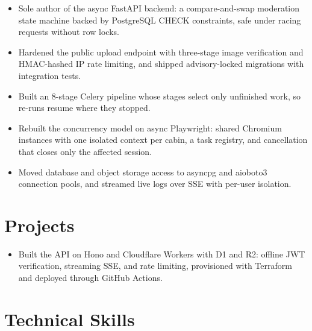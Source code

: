 \documentclass[10pt,a4paper]{article}
\begin{document}
\begin{itemize}
  \item Sole author of the async FastAPI backend: a compare-and-swap moderation state machine backed by PostgreSQL CHECK constraints, safe under racing requests without row locks.
  \item Hardened the public upload endpoint with three-stage image verification and HMAC-hashed IP rate limiting, and shipped advisory-locked migrations with integration tests.
\end{itemize}

\begin{itemize}
  \item Built an 8-stage Celery pipeline whose stages select only unfinished work, so re-runs resume where they stopped.
\end{itemize}

\vspace{4pt}

\begin{itemize}
  \item Rebuilt the concurrency model on async Playwright: shared Chromium instances with one isolated context per cabin, a task registry, and cancellation that closes only the affected session.
  \item Moved database and object storage access to asyncpg and aioboto3 connection pools, and streamed live logs over SSE with per-user isolation.
\end{itemize}

\section{Projects}
\begin{itemize}
  \item Built the API on Hono and Cloudflare Workers with D1 and R2: offline JWT verification, streaming SSE, and rate limiting, provisioned with Terraform and deployed through GitHub Actions.
\end{itemize}

\section{Technical Skills}
\end{document}
